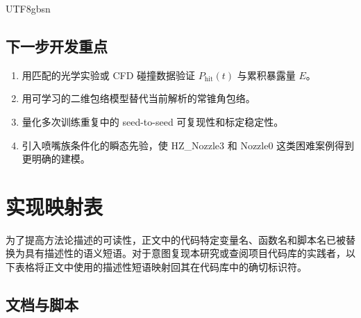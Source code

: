 \documentclass[english, 12pt, a4paper, elec, utf8, a-2b, online]{aaltothesis}
\begin{document}
\begin{CJK*}{UTF8}{gbsn}
\subsection{下一步开发重点}

\begin{enumerate}
  \item 用匹配的光学实验或 CFD 碰撞数据验证 $P_{\mathrm{hit}}(t)$ 与累积暴露量 $E$。
  \item 用可学习的二维包络模型替代当前解析的常锥角包络。
  \item 量化多次训练重复中的 seed-to-seed 可复现性和标定稳定性。
  \item 引入喷嘴族条件化的瞬态先验，使 HZ\_Nozzle3 和 Nozzle0 这类困难案例得到更明确的建模。
\end{enumerate}

\clearpage
\appendix
\section{实现映射表}
\label{app:implementation_mapping}

为了提高方法论描述的可读性，正文中的代码特定变量名、函数名和脚本名已被替换为具有描述性的语义短语。对于意图复现本研究或查阅项目代码库的实践者，以下表格将正文中使用的描述性短语映射回其在代码库中的确切标识符。

\subsection{文档与脚本}


\end{CJK*}
\end{document}
